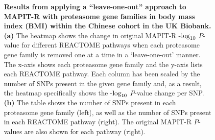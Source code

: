 \documentclass[10pt]{article}
\def\log{{\rm log}}
\begin{document}
\begin{figure}[H]
\caption{\textbf{Results from applying a ``leave-one-out'' approach to MAPIT-R with proteasome gene families in body mass index (BMI) within the Chinese cohort in the UK Biobank.} \textbf{(a)} The heatmap shows the change in original MAPIT-R -$\log_{10}$ $P$-value for different REACTOME pathways when each proteasome gene family is removed one at a time in a `leave-one-out' manner. The x-axis shows each proteasome gene family and the y-axis lists each REACTOME pathway. Each column has been scaled by the number of SNPs present in the given gene family and, as a result, the heatmap specifically shows the -$\log_{10}$ $P$-value change per SNP. \textbf{(b)} The table shows the number of SNPs present in each proteasome gene family (left), as well as the number of SNPs present in each REACTOME pathway (right). The original MAPIT-R $P$-values are also shown for each pathway (right).}
\label{InterPath-Supp-Figure-Prot-Heatplots-Chinese}
\end{figure}
\clearpage
\end{document}
